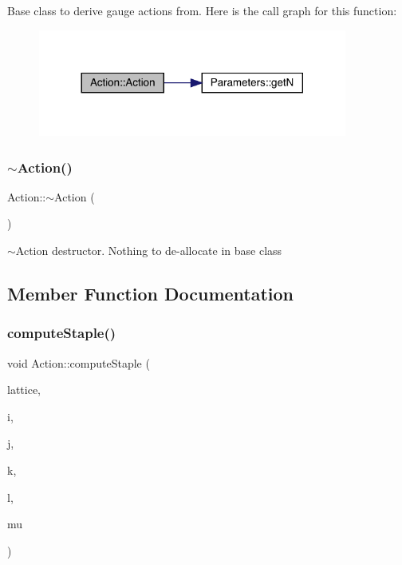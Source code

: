 Base class to derive gauge actions from. Here is the call graph for this function\+:\nopagebreak
\begin{figure}[H]
\begin{center}
\leavevmode
\includegraphics[width=288pt]{class_action_a4f457ccfc8336b565cadca56b36e0271_cgraph}
\end{center}
\end{figure}
\mbox{\label{class_action_acdb06775d157339256a8ecd55749226c}} 
\subsubsection{\texorpdfstring{$\sim$Action()}{~Action()}}
{\footnotesize\ttfamily Action\+::$\sim$\+Action (\begin{DoxyParamCaption}{ }\end{DoxyParamCaption})\hspace{0.3cm}{\ttfamily [virtual]}}



$\sim$\+Action destructor. Nothing to de-\/allocate in base class 



\subsection{Member Function Documentation}
\mbox{\label{class_action_a2d5a64b47a8913955e5911ca072ff80d}} 
\subsubsection{\texorpdfstring{computeStaple()}{computeStaple()}}
{\footnotesize\ttfamily void Action\+::compute\+Staple (\begin{DoxyParamCaption}\item[{\mbox{\hyperlink{class_lattice}{Lattice}}$<$ \mbox{\hyperlink{class_s_u3}{S\+U3}} $>$ $\ast$}]{lattice,  }\item[{unsigned int}]{i,  }\item[{unsigned int}]{j,  }\item[{unsigned int}]{k,  }\item[{unsigned int}]{l,  }\item[{int}]{mu }\end{DoxyParamCaption})\hspace{0.3cm}{\ttfamily [virtual]}}




